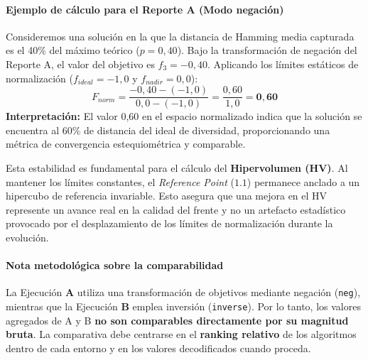 \documentclass[a4paper,10pt]{article}
\begin{document}
\paragraph{Ejemplo de cálculo para el Reporte A (Modo negación)}
Consideremos una solución en la que la distancia de Hamming media capturada es el 40\% del máximo teórico ($p=0,40$). Bajo la transformación de negación del Reporte A, el valor del objetivo es $f_3 = -0,40$. Aplicando los límites estáticos de normalización ($f_{ideal} = -1,0$ y $f_{nadir} = 0,0$):
\begin{equation}
F_{norm} = \frac{-0,40 - (-1,0)}{0,0 - (-1,0)} = \frac{0,60}{1,0} = \mathbf{0,60}
\end{equation}
\textbf{Interpretación:} El valor 0,60 en el espacio normalizado indica que la solución se encuentra al 60\% de distancia del ideal de diversidad, proporcionando una métrica de convergencia estequiométrica y comparable.

Esta estabilidad es fundamental para el cálculo del \textbf{Hipervolumen (HV)}. Al mantener los límites constantes, el \textit{Reference Point} ($1.1$) permanece anclado a un hipercubo de referencia invariable. Esto asegura que una mejora en el HV represente un avance real en la calidad del frente y no un artefacto estadístico provocado por el desplazamiento de los límites de normalización durante la evolución.

\paragraph{Nota metodológica sobre la comparabilidad}
La Ejecución \textbf{A} utiliza una transformación de objetivos mediante negación (\texttt{neg}), mientras que la Ejecución \textbf{B} emplea inversión (\texttt{inverse}). Por lo tanto, los valores agregados de A y B \textbf{no son comparables directamente por su magnitud bruta}. La comparativa debe centrarse en el \textbf{ranking relativo} de los algoritmos dentro de cada entorno y en los valores decodificados cuando proceda.
\end{document}
